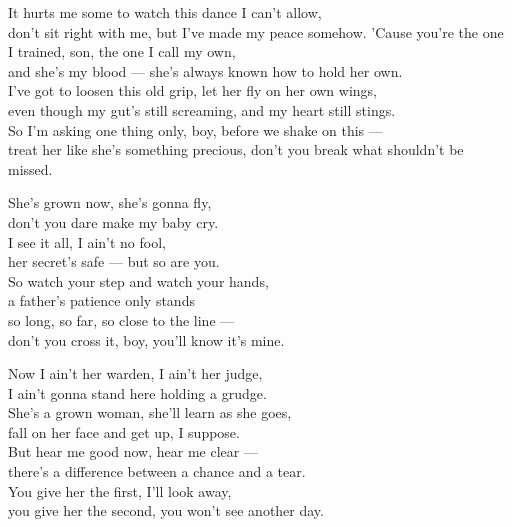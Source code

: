 \begin{lyrics}
It hurts me some to watch this dance I can't allow,\\
don't sit right with me, but I've made my peace somehow.
'Cause you're the one I trained, son, the one I call my own,\\
and she's my blood — she's always known how to hold her own.\\
I've got to loosen this old grip, let her fly on her own wings,\\
even though my gut's still screaming, and my heart still stings.\\
So I'm asking one thing only, boy, before we shake on this —\\
treat her like she's something precious, don't you break what shouldn't be missed.

She's grown now, she's gonna fly,\\
don't you dare make my baby cry.\\
I see it all, I ain't no fool,\\
her secret's safe — but so are you.\\
So watch your step and watch your hands,\\
a father's patience only stands\\
so long, so far, so close to the line —\\
don't you cross it, boy, you'll know it's mine.

Now I ain't her warden, I ain't her judge,\\
I ain't gonna stand here holding a grudge.\\
She's a grown woman, she'll learn as she goes,\\
fall on her face and get up, I suppose.\\
But hear me good now, hear me clear —\\
there's a difference between a chance and a tear.\\
You give her the first, I'll look away,\\
you give her the second, you won't see another day.


\end{lyrics}
